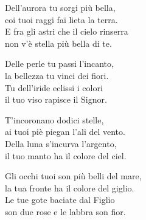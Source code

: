 
\strofa Dell'aurora tu sorgi più bella,\\
coi tuoi raggi fai lieta la terra.\\
E fra gli astri che il cielo rinserra\\
non v'è stella più bella di te.

\spazio

 

\spazio

\strofa Delle perle tu passi l'incanto,\\
la bellezza tu vinci dei fiori.\\
Tu dell'iride eclissi i colori\\
il tuo viso rapisce il Signor.

\spazio


\spazio

\strofa T'incoronano dodici stelle,\\
ai tuoi piè piegan l'ali del vento.\\
Della luna s'incurva l'argento,\\
il tuo manto ha il colore del ciel.

\spazio


\spazio

\strofa Gli occhi tuoi son più belli del mare,\\
la tua fronte ha il colore del giglio.\\
Le tue gote baciate dal Figlio\\
son due rose e le labbra son fior.

\spazio

